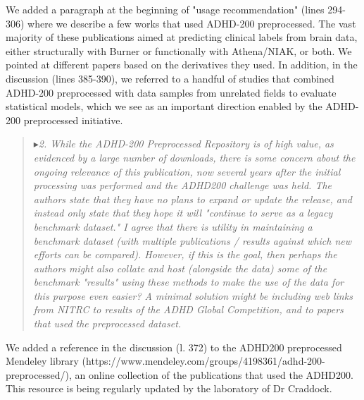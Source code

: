 \documentclass[authoryear,3p]{elsarticle}
\begin{document}
We added a paragraph at the beginning of "usage recommendation" (lines 294-306) where we describe a few works that used ADHD-200 preprocessed. The vast majority of these publications aimed at predicting clinical labels from brain data, either structurally with Burner or functionally with Athena/NIAK, or both. We pointed at different papers based on the derivatives they used. In addition, in the discussion (lines 385-390), we referred to a handful of studies that combined ADHD-200 preprocessed with data samples from unrelated fields to evaluate statistical models, which we see as an important direction enabled by the ADHD-200 preprocessed initiative. 


\begin{quote}
$\blacktriangleright$\emph{2. While the ADHD-200 Preprocessed Repository is of high value, as evidenced by a large number of downloads, there is some concern about the ongoing relevance of this publication, now several years after the initial processing was performed and the ADHD200 challenge was held. The authors state that they have no plans to expand or update the release, and instead only state that they hope it will "continue to serve as a legacy benchmark dataset."  I agree that there is utility in maintaining a benchmark dataset (with multiple publications / results against which new efforts can be compared). However, if this is the goal, then perhaps the authors might also collate and host (alongside the data) some of the benchmark "results" using these methods to make the use of the data for this purpose even easier?  A minimal solution might be including web links from NITRC to results of the ADHD Global Competition, and to papers that used the preprocessed dataset.
}
\end{quote}

We added a reference in the discussion (l. 372) to the ADHD200 preprocessed Mendeley library (https://www.mendeley.com/groups/4198361/adhd-200-preprocessed/), an online collection of the publications that used the ADHD200. This resource is being regularly updated by the laboratory of Dr Craddock. 
\end{document}
